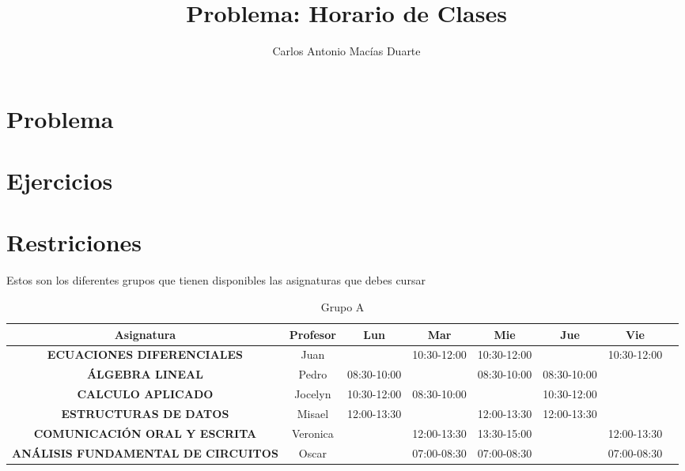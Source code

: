 \documentclass[10pt,letterpaper,twoside,openright]{article}
\author{Carlos Antonio Macías Duarte}
\title{Problema: Horario de Clases}
\begin{document}
	\maketitle

	\section{Problema}

	\section{Ejercicios}


	\section{Restriciones}

	Estos son los diferentes grupos que tienen disponibles las asignaturas que debes cursar

	\begin{table}[h!]
		\centering
		\begin{adjustbox}{max width=\textwidth}
		\begin{tabular}{c||ccccccc}
		\textbf{Asignatura}                        & \textbf{Profesor} & \textbf{Lun} & \textbf{Mar} & \textbf{Mie} & \textbf{Jue} & \textbf{Vie} \\ \hline \hline
		\textbf{ECUACIONES DIFERENCIALES}          & Juan              &              & 10:30-12:00  & 10:30-12:00  &              & 10:30-12:00  \\
		\textbf{ÁLGEBRA LINEAL}                    & Pedro             & 08:30-10:00  &              & 08:30-10:00  & 08:30-10:00  &              \\
		\textbf{CALCULO APLICADO}                  & Jocelyn           & 10:30-12:00  & 08:30-10:00  &              & 10:30-12:00  &              \\
		\textbf{ESTRUCTURAS DE DATOS}              & Misael            & 12:00-13:30  &              & 12:00-13:30  & 12:00-13:30  &              \\
		\textbf{COMUNICACIÓN ORAL Y ESCRITA}       & Veronica          &              & 12:00-13:30  & 13:30-15:00  &              & 12:00-13:30  \\
		\textbf{ANÁLISIS FUNDAMENTAL DE CIRCUITOS} & Oscar             &              & 07:00-08:30  & 07:00-08:30  &              & 07:00-08:30
		\end{tabular}
		\end{adjustbox}
		\caption{Grupo A}
		\label{tab:grupo_a}
	\end{table}
\end{document}
